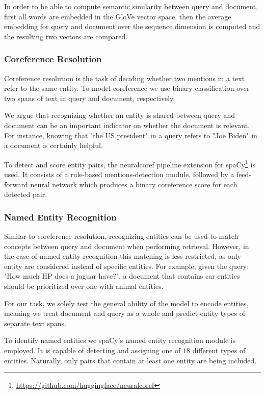In order to be able to compute semantic similarity between query and document, first all words are embedded in the GloVe \cite{pennington2014glove} vector space, then the average embedding for query and document over the sequence dimension is computed and the resulting two vectors are compared.

\subsubsection{Coreference Resolution}
Coreference resolution is the task of deciding whether two mentions in a text refer to the same entity. To model coreference we use binary classification over two spans of text in query and document, respectively.

We argue that recognizing whether an entity is shared between query and document can be an important indicator on whether the document is relevant. For instance, knowing that "the US president" in a query refers to "Joe Biden" in a document is certainly helpful.

To detect and score entity pairs, the neuralcoref pipeline extension for spaCy\footnote{\url{https://github.com/huggingface/neuralcoref}} is used. It consists of a rule-based mentions-detection module, followed by a feed-forward neural network which produces a binary coreference score for each detected pair.

\subsubsection{Named Entity Recognition}
Similar to coreference resolution, recognizing entities can be used to match concepts between query and document when performing retrieval. However, in the case of named entity recognition this matching is less restricted, as only entity  are considered instead of specific entities. For example, given the query: "How much HP does a jaguar have?", a document that contains car entities should be prioritized over one with animal entities.

For our task, we solely test the general ability of the model to encode entities, meaning we treat document and query as a whole and predict entity types of separate text spans.

To identify named entities we spaCy's \cite{spacy2} named entity recognition module is employed. It is capable of detecting and assigning one of $18$ different types of entities. Naturally, only pairs that contain at least one entity are being included.

